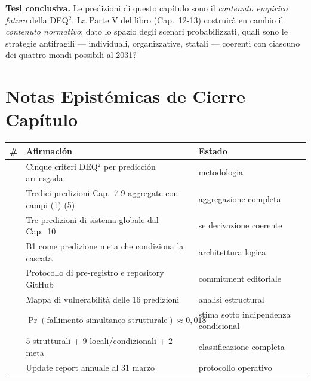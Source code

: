 \Hypoth{} \textbf{Tesi conclusiva.} Le predizioni di questo capítulo
sono il \emph{contenuto empirico futuro} della DEQ$^2$. La Parte V del
libro (Cap.~12-13) costruirà en cambio il \emph{contenuto normativo}: dato
lo spazio degli scenari probabilizzati, quali sono le strategie
antifragili --- individuali, organizzative, statali --- coerenti con
ciascuno dei quattro mondi possibili al 2031?



\section{Notas Epistémicas de Cierre
Capítulo}\label{note-epistemiche-di-chiusura-capítulo}

{\def\LTcaptype{none} %
{\small\begin{longtable}[]{@{}
  >{\raggedright\arraybackslash}p{}
  >{\raggedright\arraybackslash}p{}
  >{\raggedright\arraybackslash}p{}@{}}
\toprule\noalign{}
\begin{minipage}[b]{\linewidth}\raggedright
\#
\end{minipage} & \begin{minipage}[b]{\linewidth}\raggedright
Afirmación
\end{minipage} & \begin{minipage}[b]{\linewidth}\raggedright
Estado
\end{minipage} \\
\midrule\noalign{}
\endhead
\bottomrule\noalign{}
\endlastfoot
1 & Cinque criteri DEQ$^2$ per predicción arriesgada & \Hypoth{}
metodologia \\
2 & Tredici predizioni Cap.~7-9 aggregate con campi (1)-(5) & \Proved{}
aggregazione completa \\
3 & Tre predizioni di sistema globale dal Cap.~10 & \Hypoth{}
se derivazione coerente \\
4 & B1 come predizione meta che condiziona la cascata & \Hypoth{}
architettura logica \\
5 & Protocollo di pre-registro e repository GitHub & \Hypoth{}
commitment editoriale \\
6 & Mappa di vulnerabilità delle 16 predizioni & \Hypoth{} analisi
estructural \\
7 & \(\Pr(\text{fallimento simultaneo strutturale}) \approx 0{,}018\) &
\Conj{} stima sotto indipendenza condicional \\
8 & \(5\) strutturali + \(9\) locali/condizionali + \(2\) meta &
\Proved{} classificazione completa \\
9 & Update report annuale al 31 marzo & \Hypoth{} protocollo
operativo \\
\end{longtable}}
}



